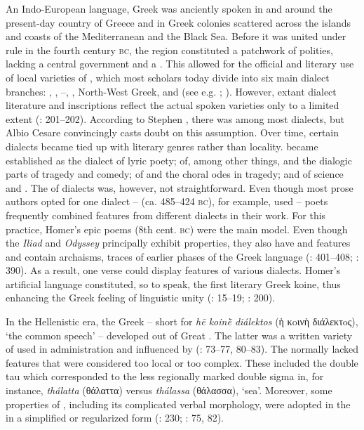 An Indo-European language, Greek was anciently spoken in and around the present-day country of Greece and in Greek colonies scattered across the islands and coasts of the Mediterranean and the Black Sea. Before it was united under  rule in the fourth century \textsc{bc}, the region constituted a patchwork of polities, lacking a central government and a . This allowed for the official and literary use of local varieties of , which most scholars today divide into six main dialect branches: , , –, , North-West Greek, and  (see e.g. \citealt{Colvin2010}; \citealt{Finkelberg2014}). However, extant dialect literature and inscriptions reflect the actual spoken varieties only to a limited extent (\citealt{Colvin2010}: 201–202). According to Stephen \citet[300, 303]{Colvin1999}, there was  among most dialects, but Albio Cesare \citet[4--5]{Cassio2016} convincingly casts doubt on this assumption. Over time, certain dialects became tied up with literary genres rather than locality.  became established as the dialect of lyric poety;  of, among other things,  and the dialogic parts of tragedy and comedy;  of  and the choral odes in tragedy; and  of science and . The  of dialects was, however, not straightforward. Even though most prose authors opted for one dialect –  (ca. 485–424 \textsc{bc}), for example, used  – poets frequently combined features from different dialects in their work. For this practice, Homer’s epic poems (8th cent. \textsc{bc}) were the main model. Even though the \textit{Iliad} and \textit{Odyssey} principally exhibit  properties, they also have  and  features and contain archaisms, traces of earlier phases of the Greek language (\citealt{Hackstein2010}: 401–408; \citealt{Tribulato2010}: 390). As a result, one verse could display features of various dialects. Homer’s artificial language constituted, so to speak, the first literary Greek koine, thus enhancing the Greek feeling of linguistic unity (\citealt{Morpurgo1987}: 15–19; \citealt{Colvin2010}: 200).

In the Hellenistic era, the Greek  – short for \textit{hē koinḕ diálektos} (ἡ κoινὴ διάλεκτoς), ‘the common speech’ – developed out of Great . The latter was a written variety of  used in administration and influenced by  (\citealt{Horrocks2010}: 73–77, 80–83). The  normally lacked  features that were considered too local or too complex. These included the  double tau which corresponded to the less regionally marked double sigma in, for instance, \textit{thálatta} (θάλαττα) versus \textit{thálassa} (θάλασσα), ‘sea’. Moreover, some properties of , including its complicated verbal morphology, were adopted in the  in a simplified or regularized form (\citealt{Brixhe2010}: 230; \citealt{Horrocks2010}: 75, 82).

